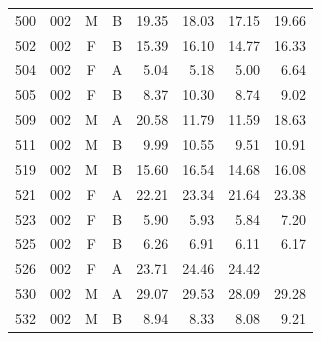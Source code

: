 \begin{table}
\begin{tabular}{|cccc|rrrr|}
500&002&M&B&19.35&18.03&17.15&19.66\\
502&002&F&B&15.39&16.10&14.77&16.33\\
504&002&F&A&5.04&5.18&5.00&6.64\\
505&002&F&B&8.37&10.30&8.74&9.02\\
509&002&M&A&20.58&11.79&11.59&18.63\\
511&002&M&B&9.99&10.55&9.51&10.91\\
519&002&M&B&15.60&16.54&14.68&16.08\\
521&002&F&A&22.21&23.34&21.64&23.38\\
523&002&F&B&5.90&5.93&5.84&7.20\\
525&002&F&B&6.26&6.91&6.11&6.17\\
526&002&F&A&23.71&24.46&24.42&\\
530&002&M&A&29.07&29.53&28.09&29.28\\
532&002&M&B&8.94&8.33&8.08&9.21\\
\hline
\end{tabular}
\end{table}